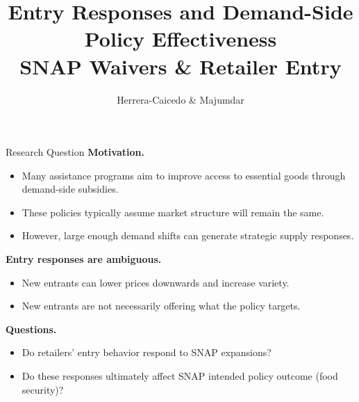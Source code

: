 \documentclass[10pt,aspectratio=169]{beamer}
\title{\alert{Entry Responses and Demand-Side Policy Effectiveness}\\
SNAP Waivers \& Retailer Entry}
\author{Herrera-Caicedo \& Majumdar}
\begin{document}

\maketitle



\begin{frame}{Research Question}
\alert{\textbf{Motivation.}}
  \begin{itemize}
     \item Many assistance programs aim to improve access to essential goods through demand-side subsidies.
     \item These policies typically assume market structure will remain the same.
     \item However, large enough demand shifts can generate strategic supply responses.
  \end{itemize}

  \alert{\textbf{Entry responses are ambiguous.}}
  \begin{itemize}
     \item New entrants can lower prices downwards and increase variety.
     \item New entrants are not necessarily offering what the policy targets. 
  \end{itemize}

  \alert{\textbf{Questions.}}
  \begin{itemize}
     \item Do retailers' entry behavior respond to SNAP expansions?
     \item Do these responses ultimately affect SNAP intended policy outcome (food security)?
  \end{itemize}
\end{frame}
\end{document}
